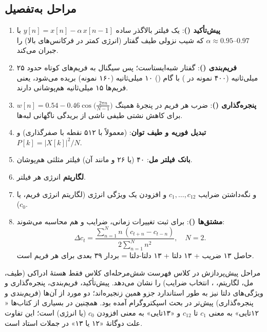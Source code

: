 \subsection{مراحل به‌تفصیل}
\begin{enumerate}
  \item \textbf{پیش‌تأکید ()}: یک فیلتر بالاگذر ساده $y[n]=x[n]-\alpha\,x[n-1]$ با $\alpha\approx0.95\text{--}0.97$ که شیب نزولی طیف گفتار (انرژی کمتر در فرکانس‌های بالا) را جبران می‌کند.
  \item \textbf{فریم‌بندی ()}: گفتار شبه‌ایستاست؛ پس سیگنال به فریم‌های کوتاه حدود ۲۵ میلی‌ثانیه (۴۰۰ نمونه در ) با گام () ۱۰ میلی‌ثانیه (۱۶۰ نمونه) بریده می‌شود، یعنی فریم‌ها ۱۵ میلی‌ثانیه هم‌پوشانی دارند.
  \item \textbf{پنجره‌گذاری ()}: ضرب هر فریم در پنجرهٔ همینگ $w[n]=0.54-0.46\cos\!\big(\tfrac{2\pi n}{N-1}\big)$ برای کاهش نشتی طیفی ناشی از بریدگی ناگهانی لبه‌ها.
  \item \textbf{تبدیل فوریه و طیف توان}:  (معمولاً با ۵۱۲ نقطه با صفر‌گذاری) و $P[k]=|X[k]|^2/N$.
  \item \textbf{بانک فیلتر مل}: ۴۰ (یا ۲۶ و مانند آن) فیلتر مثلثی هم‌پوشان.
  \item \textbf{لگاریتم} انرژی هر فیلتر.
  \item \textbf{} و نگه‌داشتن ضرایب $c_1,\ldots,c_{12}$ و افزودن یک ویژگی انرژی (لگاریتم انرژی فریم، یا $c_0$).
  \item \textbf{مشتق‌ها ()}: برای ثبت تغییرات زمانی، ضرایب  و  هم محاسبه می‌شوند:
  \[
  \Delta c_t=\frac{\sum_{n=1}^{N} n\,(c_{t+n}-c_{t-n})}{2\sum_{n=1}^{N}n^2},\quad N=2 .
  \]
  حاصل ۱۳ ضریب + ۱۳ دلتا + ۱۳ دلتا-دلتا = بردار ۳۹ بعدی برای هر فریم است.
\end{enumerate}

\begin{correctionbox}{مراحل پیش‌پردازش در کلاس}
فهرست شش‌مرحله‌ای کلاس فقط هستهٔ ادراکی  (طیف، مل، لگاریتم، ، انتخاب ضرایب) را نشان می‌دهد. پیش‌تأکید، فریم‌بندی، پنجره‌گذاری و ویژگی‌های دلتا نیز به طور استاندارد جزو همین زنجیره‌اند؛ دو مورد از آن‌ها (فریم‌بندی و پنجره‌گذاری) پیش‌تر در بحث اسپکتروگرام آمده بود. همچنین در بسیاری از کتاب‌ها « ۱۲تایی» به معنی $c_1$ تا $c_{12}$ و «۱۳تایی» به معنی افزودن $c_0$ (یا انرژی) است؛ این تفاوت علت دوگانهٔ «۱۲ یا ۱۳» در جملات استاد است.
\end{correctionbox}

